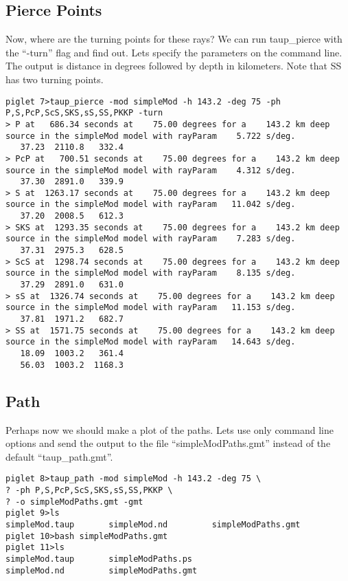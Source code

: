 \subsection{Pierce Points}

Now, where are the turning points for these rays? We can run taup\_pierce with
the ``-turn'' flag and
find out. Lets specify the parameters on the command line.
The output is distance in degrees followed by depth in kilometers.
Note that SS has two turning points.

\begin{verbatim}
piglet 7>taup_pierce -mod simpleMod -h 143.2 -deg 75 -ph P,S,PcP,ScS,SKS,sS,SS,PKKP -turn
> P at   686.34 seconds at    75.00 degrees for a    143.2 km deep source in the simpleMod model with rayParam    5.722 s/deg.
   37.23  2110.8   332.4
> PcP at   700.51 seconds at    75.00 degrees for a    143.2 km deep source in the simpleMod model with rayParam    4.312 s/deg.
   37.30  2891.0   339.9
> S at  1263.17 seconds at    75.00 degrees for a    143.2 km deep source in the simpleMod model with rayParam   11.042 s/deg.
   37.20  2008.5   612.3
> SKS at  1293.35 seconds at    75.00 degrees for a    143.2 km deep source in the simpleMod model with rayParam    7.283 s/deg.
   37.31  2975.3   628.5
> ScS at  1298.74 seconds at    75.00 degrees for a    143.2 km deep source in the simpleMod model with rayParam    8.135 s/deg.
   37.29  2891.0   631.0
> sS at  1326.74 seconds at    75.00 degrees for a    143.2 km deep source in the simpleMod model with rayParam   11.153 s/deg.
   37.81  1971.2   682.7
> SS at  1571.75 seconds at    75.00 degrees for a    143.2 km deep source in the simpleMod model with rayParam   14.643 s/deg.
   18.09  1003.2   361.4
   56.03  1003.2  1168.3
\end{verbatim}

\subsection{Path}

Perhaps now we should make a plot of the
paths. Lets use only command line options and send the output to the file
``simpleModPaths.gmt'' instead of the default ``taup\_path.gmt''.

\begin{verbatim}
piglet 8>taup_path -mod simpleMod -h 143.2 -deg 75 \
? -ph P,S,PcP,ScS,SKS,sS,SS,PKKP \
? -o simpleModPaths.gmt -gmt
piglet 9>ls
simpleMod.taup       simpleMod.nd         simpleModPaths.gmt
piglet 10>bash simpleModPaths.gmt
piglet 11>ls
simpleMod.taup       simpleModPaths.ps
simpleMod.nd         simpleModPaths.gmt
\end{verbatim}


